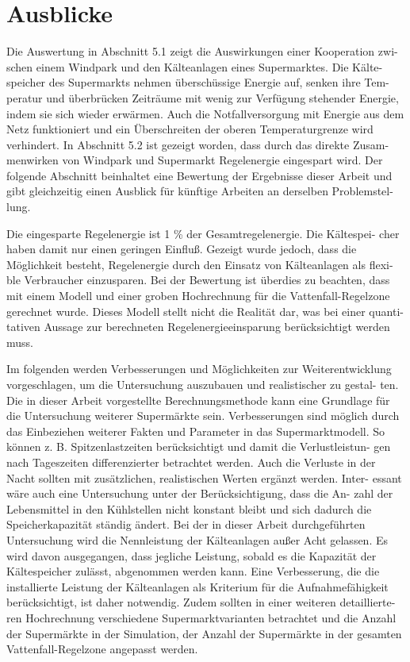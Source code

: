 \chapter{Ausblicke}

Die Auswertung in Abschnitt 5.1 zeigt die Auswirkungen einer Kooperation zwi-
schen einem Windpark und den Kälteanlagen eines Supermarktes. Die Kälte-
speicher des Supermarkts nehmen überschüssige Energie auf, senken ihre Tem-
peratur und überbrücken Zeiträume mit wenig zur Verfügung stehender Energie,
indem sie sich wieder erwärmen. Auch die Notfallversorgung mit Energie aus
dem Netz funktioniert und ein Überschreiten der oberen Temperaturgrenze wird
verhindert. In Abschnitt 5.2 ist gezeigt worden, dass durch das direkte Zusam-
menwirken von Windpark und Supermarkt Regelenergie eingespart wird. Der
folgende Abschnitt beinhaltet eine Bewertung der Ergebnisse dieser Arbeit und
gibt gleichzeitig einen Ausblick für künftige Arbeiten an derselben Problemstel-
lung.

Die eingesparte Regelenergie ist 1 \% der Gesamtregelenergie. Die Kältespei-
cher haben damit nur einen geringen Einfluß. Gezeigt wurde jedoch, dass die
Möglichkeit besteht, Regelenergie durch den Einsatz von Kälteanlagen als flexi-
ble Verbraucher einzusparen. Bei der Bewertung ist überdies zu beachten, dass
mit einem Modell und einer groben Hochrechnung für die Vattenfall-Regelzone
gerechnet wurde. Dieses Modell stellt nicht die Realität dar, was bei einer quanti-
tativen Aussage zur berechneten Regelenergieeinsparung berücksichtigt werden
muss.

Im folgenden werden Verbesserungen und Möglichkeiten zur Weiterentwicklung
vorgeschlagen, um die Untersuchung auszubauen und realistischer zu gestal-
ten. Die in dieser Arbeit vorgestellte Berechnungsmethode kann eine Grundlage
für die Untersuchung weiterer Supermärkte sein. Verbesserungen sind möglich
durch das Einbeziehen weiterer Fakten und Parameter in das Supermarktmodell.
So können z. B. Spitzenlastzeiten berücksichtigt und damit die Verlustleistun-
gen nach Tageszeiten differenzierter betrachtet werden. Auch die Verluste in
der Nacht sollten mit zusätzlichen, realistischen Werten ergänzt werden. Inter-
essant wäre auch eine Untersuchung unter der Berücksichtigung, dass die An-
zahl der Lebensmittel in den Kühlstellen nicht konstant bleibt und sich dadurch
die Speicherkapazität ständig ändert. Bei der in dieser Arbeit durchgeführten
Untersuchung wird die Nennleistung der Kälteanlagen außer Acht gelassen. Es
wird davon ausgegangen, dass jegliche Leistung, sobald es die Kapazität der
Kältespeicher zulässt, abgenommen werden kann. Eine Verbesserung, die die
installierte Leistung der Kälteanlagen als Kriterium für die Aufnahmefähigkeit
berücksichtigt, ist daher notwendig. Zudem sollten in einer weiteren detaillierte-
ren Hochrechnung verschiedene Supermarktvarianten betrachtet und die Anzahl
der Supermärkte in der Simulation, der Anzahl der Supermärkte in der gesamten
Vattenfall-Regelzone angepasst werden.


